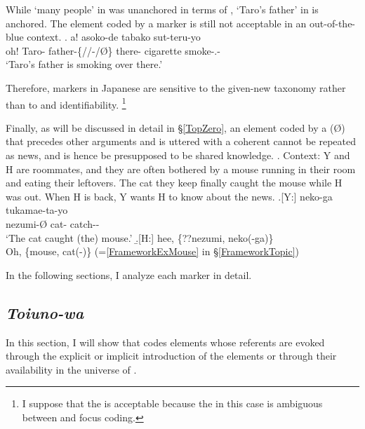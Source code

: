 While  `many people' in \Last was unanchored in terms of ,
 `Taro's father' in \Next is anchored.
The element coded by a  marker is still not acceptable in an out-of-the-blue context.
%
\exg. a!   asoko-de tabako sut-teru-yo \\
 oh! Taro- father-\{//-/{\O}\} there- cigarette smoke-.- \\
 `Taro's father is smoking over there.'

Therefore,  markers in Japanese are sensitive to the given-new taxonomy rather than to  and identifiability.%
 \footnote{
 I suppose that the  is acceptable
 because the  in this case is ambiguous between  and focus coding.
 }

Finally, as will be discussed in detail in \S \ref{TopZero},
an element coded by a  ({\O}) that precedes other arguments and is uttered with a coherent 
cannot be repeated as news, and is hence be presupposed to be shared knowledge.
\ex. \label{mouse}Context: Y and H are roommates,
		and they are often bothered by a mouse running in their room
		and eating their leftovers.
		The cat they keep finally caught the mouse while H was out.
		When H is back, Y wants H to know about the news.
	\ag.[Y:]  neko-ga tukamae-ta-yo \\
		nezumi-{\O} cat- catch-- \\
		`The cat caught (the) mouse.'
	\b.[H:] hee, \{??nezumi, neko(-ga)\} \\
	  Oh, \{mouse, cat(-)\}
	  \hfill{(=\ref{FrameworkExMouse} in \S \ref{FrameworkTopic})}


In the following sections,
I analyze each  marker in detail.

\subsection{\textit{Toiuno-wa}}\label{Toiunowa}

In this section,
I will show that  codes elements whose referents are evoked
through the explicit or implicit introduction of the elements or through their availability in the universe of .

